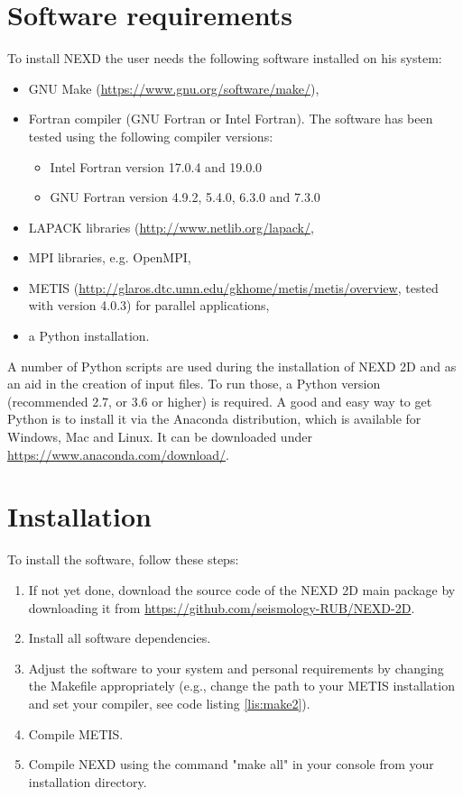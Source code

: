 \section{Software requirements}
\label{sec:softreq}
To install NEXD the user needs the following software installed on his system:
\begin{itemize}
    \item GNU Make (\url{https://www.gnu.org/software/make/}),
    \item Fortran compiler (GNU Fortran or Intel Fortran). The software has been tested using the following compiler versions:
		\begin{itemize}
			\item Intel Fortran version 17.0.4 and 19.0.0
			\item GNU Fortran version 4.9.2, 5.4.0, 6.3.0 and 7.3.0
		\end{itemize}
    \item LAPACK libraries (\url{http://www.netlib.org/lapack/},
    \item MPI libraries, e.g. OpenMPI, 
    \item METIS (\url{http://glaros.dtc.umn.edu/gkhome/metis/metis/overview}, tested with version 4.0.3) for parallel applications,
    \item a Python installation.
\end{itemize}
 
A number of Python scripts are used during the installation of NEXD 2D and as an aid in the creation of input files. To run those, a Python version (recommended 2.7, or 3.6 or higher) is required. A good and easy way to get Python is to install it via the Anaconda distribution, which is available for Windows, Mac and Linux. It can be downloaded under \url{https://www.anaconda.com/download/}.

\section{Installation}
To install the software, follow these steps:
\begin{enumerate}
    \item If not yet done, download the source code of the NEXD 2D main package by downloading it from \url{https://github.com/seismology-RUB/NEXD-2D}.
    \item Install all software dependencies.
    \item Adjust the software to your system and personal requirements by changing the Makefile appropriately (e.g., change the path to your METIS installation and set your compiler, see code listing \ref{lis:make2}).
    \item Compile METIS.
    \item Compile NEXD using the command "make all" in your console from your installation directory.
\end{enumerate}

